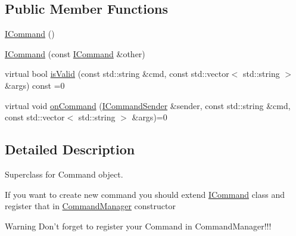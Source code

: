 \subsection*{Public Member Functions}
\begin{DoxyCompactItemize}
\item 
\hyperlink{class_i_command_acf142bc073aaf829663ba395bacd34cc}{I\-Command} ()
\item 
\hyperlink{class_i_command_a1a3e297aea5c94d785060e49801860dc}{I\-Command} (const \hyperlink{class_i_command}{I\-Command} \&other)
\item 
virtual bool \hyperlink{class_i_command_acb0beea12bd5ec963884dc35d4d48014}{is\-Valid} (const std\-::string \&cmd, const std\-::vector$<$ std\-::string $>$ \&args) const =0
\item 
virtual void \hyperlink{class_i_command_a55f931bb7304e2bc591ba2edd717e86c}{on\-Command} (\hyperlink{class_i_command_sender}{I\-Command\-Sender} \&sender, const std\-::string \&cmd, const std\-::vector$<$ std\-::string $>$ \&args)=0
\end{DoxyCompactItemize}


\subsection{Detailed Description}
Superclass for Command object. 

If you want to create new command you should extend \hyperlink{class_i_command}{I\-Command} class and register that in \hyperlink{class_command_manager}{Command\-Manager} constructor

\begin{DoxyWarning}{Warning}
Don't forget to register your Command in Command\-Manager!!! 
\end{DoxyWarning}


